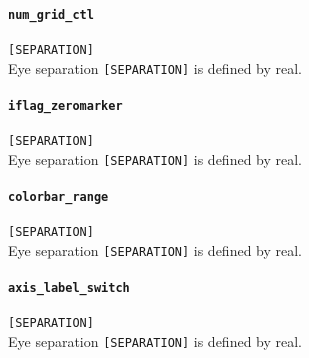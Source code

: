 \paragraph{\tt num_grid_ctl}
\label{href_t:num_grid_ctl}
\verb|[SEPARATION]| \\
Eye separation \verb|[SEPARATION]| is defined by real.

\paragraph{\tt iflag_zeromarker}
\label{href_t:iflag_zeromarker}
\verb|[SEPARATION]| \\
Eye separation \verb|[SEPARATION]| is defined by real.

\paragraph{\tt colorbar_range}
\label{href_t:colorbar_range}
\verb|[SEPARATION]| \\
Eye separation \verb|[SEPARATION]| is defined by real.

\paragraph{\tt axis_label_switch}
\label{href_t:axis_label_switch}
\verb|[SEPARATION]| \\
Eye separation \verb|[SEPARATION]| is defined by real.



